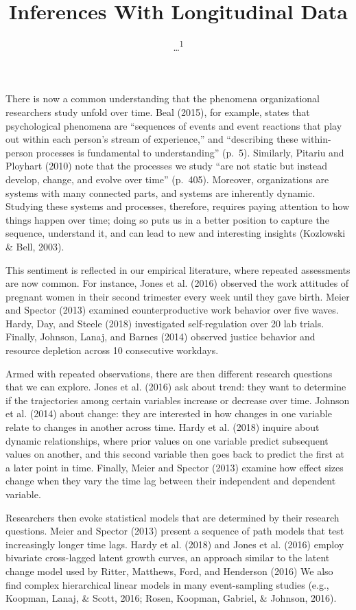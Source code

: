 \documentclass[english,,man]{apa6}
\title{Inferences With Longitudinal Data}
\author{\ldots{}\textsuperscript{1}}
\date{}
\affiliation{
\vspace{0.5cm}
\textsuperscript{1} ...}
\theoremstyle{definition}
\theoremstyle{definition}
\theoremstyle{definition}
\theoremstyle{remark}
\begin{document}
\maketitle

There is now a common understanding that the phenomena organizational
researchers study unfold over time. Beal (2015), for example, states
that psychological phenomena are \enquote{sequences of events and event
reactions that play out within each person's stream of experience,} and
\enquote{describing these within-person processes is fundamental to
understanding} (p.~5). Similarly, Pitariu and Ployhart (2010) note that
the processes we study \enquote{are not static but instead develop,
change, and evolve over time} (p.~405). Moreover, organizations are
systems with many connected parts, and systems are inherently dynamic.
Studying these systems and processes, therefore, requires paying
attention to how things happen over time; doing so puts us in a better
position to capture the sequence, understand it, and can lead to new and
interesting insights (Kozlowski \& Bell, 2003).

This sentiment is reflected in our empirical literature, where repeated
assessments are now common. For instance, Jones et al. (2016) observed
the work attitudes of pregnant women in their second trimester every
week until they gave birth. Meier and Spector (2013) examined
counterproductive work behavior over five waves. Hardy, Day, and Steele
(2018) investigated self-regulation over 20 lab trials. Finally,
Johnson, Lanaj, and Barnes (2014) observed justice behavior and resource
depletion across 10 consecutive workdays.

Armed with repeated observations, there are then different research
questions that we can explore. Jones et al. (2016) ask about trend: they
want to determine if the trajectories among certain variables increase
or decrease over time. Johnson et al. (2014) about change: they are
interested in how changes in one variable relate to changes in another
across time. Hardy et al. (2018) inquire about dynamic relationships,
where prior values on one variable predict subsequent values on another,
and this second variable then goes back to predict the first at a later
point in time. Finally, Meier and Spector (2013) examine how effect
sizes change when they vary the time lag between their independent and
dependent variable.

Researchers then evoke statistical models that are determined by their
research questions. Meier and Spector (2013) present a sequence of path
models that test increasingly longer time lags. Hardy et al. (2018) and
Jones et al. (2016) employ bivariate cross-lagged latent growth curves,
an approach similar to the latent change model used by Ritter, Matthews,
Ford, and Henderson (2016) We also find complex hierarchical linear
models in many event-sampling studies (e.g., Koopman, Lanaj, \& Scott,
2016; Rosen, Koopman, Gabriel, \& Johnson, 2016).
\end{document}

